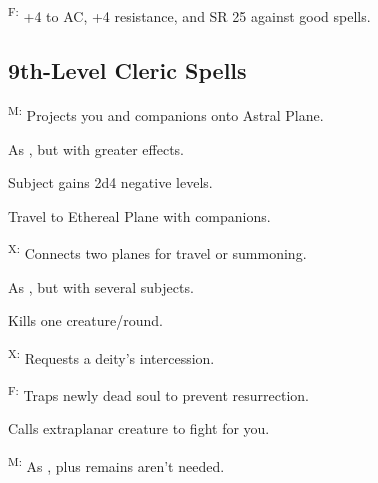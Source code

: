 \textsuperscript{F:} +4 to AC, +4 resistance, and SR 25 against good spells.



\subsection{9th-Level Cleric Spells}

\textsuperscript{M:} Projects you and companions onto Astral Plane.

 As , but with greater effects. %

 Subject gains 2d4 negative levels.

 Travel to Ethereal Plane with companions.

\textsuperscript{X:} Connects two planes for travel or summoning.

 As , but with several subjects.

 Kills one creature/round.

\textsuperscript{X:} Requests a deity's intercession.

\textsuperscript{F:} Traps newly dead soul to prevent resurrection.


 Calls extraplanar creature to fight for you.

\textsuperscript{M:} As , plus remains aren't needed.